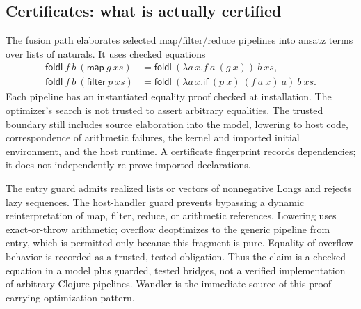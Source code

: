 \documentclass[acmsmall,screen,review,nonacm]{acmart}
\newcommand{\kw}[1]{\mathsf{#1}}
\begin{document}
\subsection{Certificates: what is actually certified}
The fusion path elaborates selected map/filter/reduce pipelines into ansatz
terms over lists of naturals. It uses checked equations
\[
\begin{split}
\kw{foldl}\ f\ b\ (\kw{map}\ g\ xs)
 &=\kw{foldl}\ (\lambda a\,x.f\ a\ (g\ x))\ b\ xs,\\
\kw{foldl}\ f\ b\ (\kw{filter}\ p\ xs)
 &=\kw{foldl}\ (\lambda a\,x.\kw{if}\ (p\ x)\ (f\ a\ x)\ a)\ b\ xs.
\end{split}
\]
Each pipeline has an instantiated equality proof checked at installation.
The optimizer's search is not trusted to assert arbitrary equalities. The
trusted boundary still includes source elaboration into the model, lowering
to host code, correspondence of arithmetic failures, the kernel and imported
initial environment, and the host runtime. A certificate fingerprint records
dependencies; it does not independently re-prove imported declarations.

The entry guard admits realized lists or vectors of nonnegative Longs and
rejects lazy sequences. The host-handler guard prevents bypassing a dynamic
reinterpretation of map, filter, reduce, or arithmetic references. Lowering
uses exact-or-throw arithmetic; overflow deoptimizes to the generic pipeline
from entry, which is permitted only because this fragment is pure. Equality
of overflow behavior is recorded as a trusted, tested obligation. Thus the
claim is a checked equation in a model plus guarded, tested bridges, not a
verified implementation of arbitrary Clojure pipelines. Wandler is the
immediate source of this proof-carrying optimization pattern.
\end{document}

